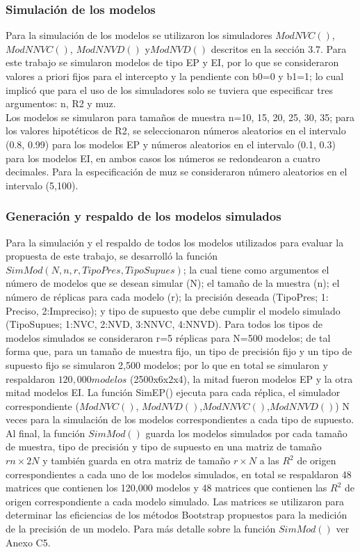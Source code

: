 \subsubsection{Simulación de los modelos}
Para la simulación de los modelos se utilizaron los simuladores $ModNVC()$, $ModNNVC()$, $ModNNVD()$ y$ ModNVD()$ descritos en la sección 3.7. Para este trabajo se simularon modelos de tipo EP y EI, por lo que se consideraron valores a priori fijos para el intercepto y la pendiente con b0=0 y b1=1; lo cual implicó que para el uso de los simuladores solo se tuviera que especificar tres argumentos: n, R2 y muz.\\

Los modelos se simularon para tamaños de muestra n=10, 15, 20, 25, 30, 35; para los valores hipotéticos de R2, se seleccionaron números aleatorios en el intervalo (0.8, 0.99) para los modelos EP y números aleatorios en el intervalo (0.1, 0.3) para los modelos EI, en ambos casos los números se redondearon a cuatro decimales. Para la especificación de muz se consideraron número aleatorios en el intervalo (5,100).\\
 

\subsubsection{Generación y respaldo de los modelos simulados}

Para la simulación y el respaldo de todos los modelos utilizados para evaluar la propuesta de este trabajo, se desarrolló la función $SimMod(N,n,r,TipoPres,TipoSupues)$; la cual tiene como argumentos el número de modelos que se desean simular (N); el tamaño de la muestra (n); el número de réplicas para cada modelo (r);  la precisión deseada (TipoPres; 1: Preciso, 2:Impreciso); y tipo de supuesto que debe cumplir el modelo simulado (TipoSupues; 1:NVC, 2:NVD, 3:NNVC, 4:NNVD). Para todos los tipos de modelos simulados se consideraron r=5 réplicas para N=500 modelos; de tal forma que, para un tamaño de muestra fijo, un tipo de precisión fijo y un tipo de supuesto fijo se simularon 2,500 modelos; por lo que en total se simularon y respaldaron $120,000 modelos$ (2500x6x2x4), la mitad fueron modelos EP y la otra mitad modelos EI.
La función SimEP() ejecuta para cada réplica, el simulador correspondiente ($ModNVC()$, $ModNVD()$,$ ModNNVC()$,$ ModNNVD()$)  N veces para la simulación de los modelos correspondientes a cada tipo de supuesto. Al final, la función $SimMod()$ guarda los modelos simulados por cada tamaño de muestra, tipo de precisión y tipo de supuesto en una matriz de tamaño $rn \times 2N$ y también guarda en otra matriz de tamaño $r \times N$ a las $R^2$ de origen correspondientes a cada uno de los modelos simulados, en total se respaldaron 48 matrices que contienen los 120,000 modelos y 48 matrices que contienen las $R^2$ de origen correspondiente a cada modelo simulado. Las matrices se utilizaron para determinar las eficiencias de los métodos Bootstrap propuestos para la medición de la precisión de un modelo. Para más detalle sobre la función $SimMod()$ ver Anexo C5.\\

